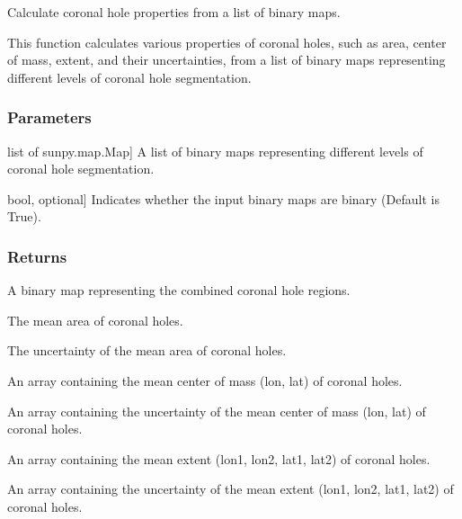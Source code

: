 \documentclass[letterpaper,10pt,english]{sphinxmanual}
\begin{document}
\begin{fulllineitems}
\label{\detokenize{pycatch/utils/ch_mapping:pycatch.utils.ch_mapping.catch_calc}}
\pysigstartsignatures
{}
\pysigstopsignatures
\sphinxAtStartPar
Calculate coronal hole properties from a list of binary maps.

\sphinxAtStartPar
This function calculates various properties of coronal holes, such as area, center of mass, extent, and their uncertainties, from a list of binary maps representing different levels of coronal hole segmentation.


\subsubsection{Parameters}
\label{\detokenize{pycatch/utils/ch_mapping:id1}}\begin{description}
\sphinxlineitem{binmaps}{[}list of sunpy.map.Map{]}
\sphinxAtStartPar
A list of binary maps representing different levels of coronal hole segmentation.

\sphinxlineitem{binary}{[}bool, optional{]}
\sphinxAtStartPar
Indicates whether the input binary maps are binary (Default is True).

\end{description}


\subsubsection{Returns}
\label{\detokenize{pycatch/utils/ch_mapping:id2}}\begin{description}
\sphinxAtStartPar
A binary map representing the combined coronal hole regions.

\sphinxAtStartPar
The mean area of coronal holes.

\sphinxAtStartPar
The uncertainty of the mean area of coronal holes.

\sphinxAtStartPar
An array containing the mean center of mass (lon, lat) of coronal holes.

\sphinxAtStartPar
An array containing the uncertainty of the mean center of mass (lon, lat) of coronal holes.

\sphinxAtStartPar
An array containing the mean extent (lon1, lon2, lat1, lat2) of coronal holes.

\sphinxAtStartPar
An array containing the uncertainty of the mean extent (lon1, lon2, lat1, lat2) of coronal holes.

\end{description}

\end{fulllineitems}
\end{document}
